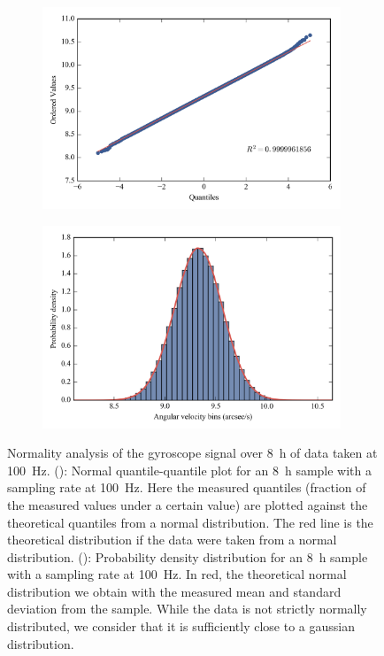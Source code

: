 \begin{figure}[!h]

\begin{subfigure}[b]{0.5\textwidth}
		\centering
		\includegraphics[width=0.98\textwidth]{Figures/qqplot_11005.png} 
		\caption{}
		\label{subfig:probplot11005}
\end{subfigure}
\begin{subfigure}[b]{0.5\textwidth}
		\centering
		\includegraphics[width=0.98\textwidth]{Figures/distrib_11005.png} 
		\caption{}
		\label{subfig:density11005}
\end{subfigure}
\caption[Normality analysis]{Normality analysis of the gyroscope signal over \SI{8}{\hour} of data taken at \SI{100}{\hertz}. (): Normal quantile-quantile plot for an \SI{8}{\hour} sample with a sampling rate at \SI{100}{\hertz}. Here the measured quantiles (fraction of the measured values under a certain value) are plotted against the theoretical quantiles from a normal distribution. The red line is the theoretical distribution if the data were taken from a normal distribution. (): Probability density distribution for an \SI{8}{\hour} sample with a sampling rate at \SI{100}{\hertz}. In red, the theoretical normal distribution we obtain with the measured mean and standard deviation from the sample. While the data is not strictly normally distributed, we consider that it is sufficiently close to a gaussian distribution.}
\label{fig:gyroprobdensity}
\end{figure}




